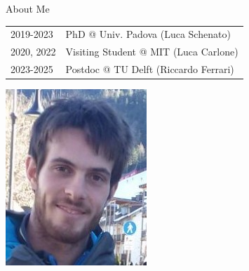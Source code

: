 \documentclass[10pt,xcolor={dvipsnames}]{beamer}
\begin{document}
	\begin{frame}{About Me}
		
		\begin{center}
			\begin{minipage}[l]{.6\textwidth}
				\begin{tabular}{ll}
					2019-2023 & PhD @ Univ. Padova (Luca Schenato) \vspace{2mm}\\
					2020, 2022 & Visiting Student @ MIT (Luca Carlone) \vspace{2mm}\\
					2023-2025 & Postdoc @ TU Delft (Riccardo Ferrari)
				\end{tabular}
			\end{minipage}%
			\begin{minipage}[r]{.4\textwidth}
				\centering
				\includegraphics[width=.35\linewidth]{ballotta}
			\end{minipage}
		\end{center}
		
	\end{frame}
	
\end{document}
